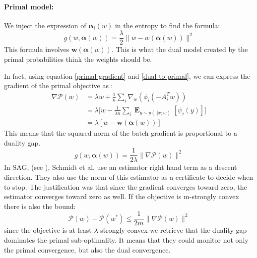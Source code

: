 \documentclass{article}
\DeclareMathOperator{\1}{\mathbb{1}}
\DeclareMathOperator{\E}{\mathbf{E}}
\begin{document}
\paragraph{Primal model:}
We inject the expression of $\bm \alpha_i(w)$ in the entropy to find the formula:
\begin{equation}
	\label{primal duality gap}
	g(w,\bm \alpha(w)) = \frac{\lambda}{2} \|w-w(\bm \alpha(w))\|^2
\end{equation}
This formula involves $\bm w(\bm \alpha(w))$.
This is what the dual model created by the primal probabilities think the weights should be. 

In fact, using equation \ref{primal gradient} and \ref{dual to primal}, we can express the gradient of the primal objective 	as :
\begin{align*}
	\nabla \mathscr P(w) 
	& = \lambda w + \frac{1}{n} \sum_i \nabla_w(\phi_i(-A_i^Tw)) \\
	& = \lambda \bigg [ w - \frac{1}{\lambda n} \sum_i \E_{y \sim p(. | x ; w)} [\psi_i(y)] \bigg ] \\
	& = \lambda [ w - \bm w(\bm \alpha(w))]
\end{align*}
This means that the squared norm of the batch gradient is proportional to a duality gap.
\begin{equation}
	g(w,\bm \alpha(w)) = \frac{1}{2 \lambda} \|\nabla \mathscr P(w)\|^2
\end{equation}
In SAG, (see \cite{schmidt_non-uniform_2015}), Schmidt et al. use an estimator right hand term as a descent direction.
They also use the norm of this estimator as a certificate to decide when to stop.
The justification was that since the gradient converges toward zero, the estimator converges toward zero as well.
If the objective is m-strongly convex there is also the bound:
\begin{equation*}
	\mathscr P (w) - \mathscr P(w^*) \leq \frac{1}{2 m}\|\nabla \mathscr P (w)\|^2
\end{equation*}
since the objective is at least $\lambda$-strongly convex we retrieve that the duality gap dominates the primal sub-optimality.
It means that they could monitor not only the primal convergence, but also the dual convergence.
\end{document}

